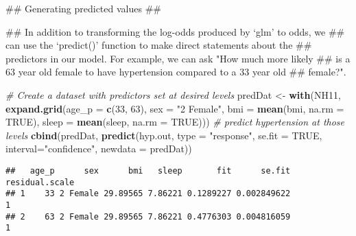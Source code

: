 \documentclass[]{article}
\newenvironment{Shaded}{\begin{snugshade}}{\end{snugshade}}
\newcommand{\KeywordTok}[1]{\textcolor[rgb]{0.13,0.29,0.53}{\textbf{#1}}}
\newcommand{\DataTypeTok}[1]{\textcolor[rgb]{0.13,0.29,0.53}{#1}}
\newcommand{\DecValTok}[1]{\textcolor[rgb]{0.00,0.00,0.81}{#1}}
\newcommand{\StringTok}[1]{\textcolor[rgb]{0.31,0.60,0.02}{#1}}
\newcommand{\CommentTok}[1]{\textcolor[rgb]{0.56,0.35,0.01}{\textit{#1}}}
\newcommand{\OtherTok}[1]{\textcolor[rgb]{0.56,0.35,0.01}{#1}}
\newcommand{\NormalTok}[1]{#1}
\begin{document}
\begin{Shaded}
\begin{Highlighting}[]
\NormalTok{## Generating predicted values}
\NormalTok{##}

\NormalTok{##   In addition to transforming the log-odds produced by `glm' to odds, we}
\NormalTok{##   can use the `predict()' function to make direct statements about the}
\NormalTok{##   predictors in our model. For example, we can ask "How much more likely}
\NormalTok{##   is a 63 year old female to have hypertension compared to a 33 year old}
\NormalTok{##   female?".}

\CommentTok{# Create a dataset with predictors set at desired levels}
\NormalTok{predDat <-}\StringTok{ }\KeywordTok{with}\NormalTok{(NH11,}
                \KeywordTok{expand.grid}\NormalTok{(}\DataTypeTok{age_p =} \KeywordTok{c}\NormalTok{(}\DecValTok{33}\NormalTok{, }\DecValTok{63}\NormalTok{),}
                            \DataTypeTok{sex =} \StringTok{"2 Female"}\NormalTok{,}
                            \DataTypeTok{bmi =} \KeywordTok{mean}\NormalTok{(bmi, }\DataTypeTok{na.rm =} \OtherTok{TRUE}\NormalTok{),}
                            \DataTypeTok{sleep =} \KeywordTok{mean}\NormalTok{(sleep, }\DataTypeTok{na.rm =} \OtherTok{TRUE}\NormalTok{)))}
\CommentTok{# predict hypertension at those levels}
\KeywordTok{cbind}\NormalTok{(predDat, }\KeywordTok{predict}\NormalTok{(hyp.out, }\DataTypeTok{type =} \StringTok{"response"}\NormalTok{,}
                       \DataTypeTok{se.fit =} \OtherTok{TRUE}\NormalTok{, }\DataTypeTok{interval=}\StringTok{"confidence"}\NormalTok{,}
                       \DataTypeTok{newdata =}\NormalTok{ predDat))}
\end{Highlighting}
\end{Shaded}

\begin{verbatim}
##   age_p      sex      bmi   sleep       fit      se.fit residual.scale
## 1    33 2 Female 29.89565 7.86221 0.1289227 0.002849622              1
## 2    63 2 Female 29.89565 7.86221 0.4776303 0.004816059              1
\end{verbatim}

\begin{Shaded}
\end{Shaded}
\end{document}
